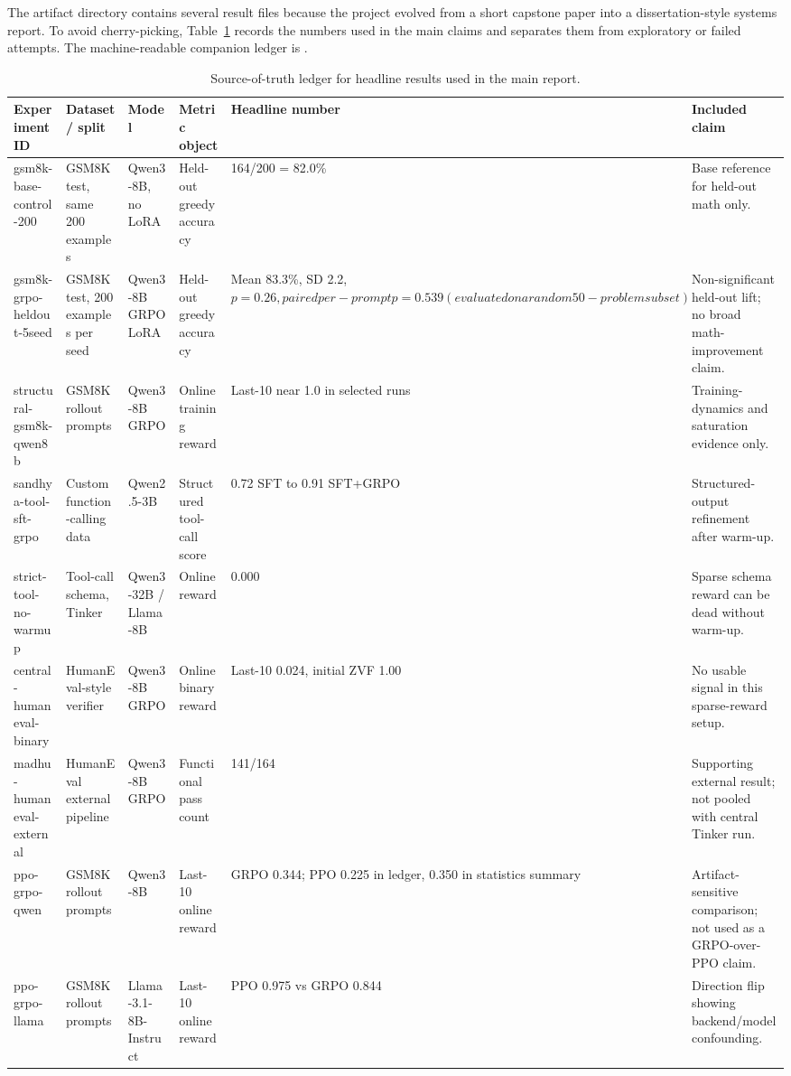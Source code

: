 \documentclass[12pt,a4paper]{report}
\begin{document}
The artifact directory contains several result files because the project evolved from a short capstone paper into a dissertation-style systems report. To avoid cherry-picking, Table~\ref{tab:source-ledger} records the numbers used in the main claims and separates them from exploratory or failed attempts. The machine-readable companion ledger is .

\begin{table}[ht]
\centering
\caption{Source-of-truth ledger for headline results used in the main report.}
\label{tab:source-ledger}
\scriptsize
\setlength{\tabcolsep}{3pt}
\footnotesize
\begin{tabularx}{\textwidth}{p{2.6cm}p{2.5cm}p{2.4cm}p{2.5cm}p{2.3cm}X}
\toprule
Experiment ID & Dataset / split & Model & Metric object & Headline number & Included claim\\
\midrule
gsm8k-base-control-200 & GSM8K test, same 200 examples & Qwen3-8B, no LoRA & Held-out greedy accuracy & 164/200 = 82.0\% & Base reference for held-out math only.\\
gsm8k-grpo-heldout-5seed & GSM8K test, 200 examples per seed & Qwen3-8B GRPO LoRA & Held-out greedy accuracy & Mean 83.3\%, SD 2.2, $p=0.26, paired per-prompt p=0.539 (evaluated on a random 50-problem subset)$ & Non-significant held-out lift; no broad math-improvement claim.\\
structural-gsm8k-qwen8b & GSM8K rollout prompts & Qwen3-8B GRPO & Online training reward & Last-10 near 1.0 in selected runs & Training-dynamics and saturation evidence only.\\
sandhya-tool-sft-grpo & Custom function-calling data & Qwen2.5-3B & Structured tool-call score & 0.72 SFT to 0.91 SFT+GRPO & Structured-output refinement after warm-up.\\
strict-tool-no-warmup & Tool-call schema, Tinker & Qwen3-32B / Llama-8B & Online reward & 0.000 & Sparse schema reward can be dead without warm-up.\\
central-humaneval-binary & HumanEval-style verifier & Qwen3-8B GRPO & Online binary reward & Last-10 0.024, initial ZVF 1.00 & No usable signal in this sparse-reward setup.\\
madhu-humaneval-external & HumanEval external pipeline & Qwen3-8B GRPO & Functional pass count & 141/164 & Supporting external result; not pooled with central Tinker run.\\
ppo-grpo-qwen & GSM8K rollout prompts & Qwen3-8B & Last-10 online reward & GRPO 0.344; PPO 0.225 in ledger, 0.350 in statistics summary & Artifact-sensitive comparison; not used as a GRPO-over-PPO claim.\\
ppo-grpo-llama & GSM8K rollout prompts & Llama-3.1-8B-Instruct & Last-10 online reward & PPO 0.975 vs GRPO 0.844 & Direction flip showing backend/model confounding.\\
\bottomrule
\end{tabularx}
\end{table}
\end{document}
